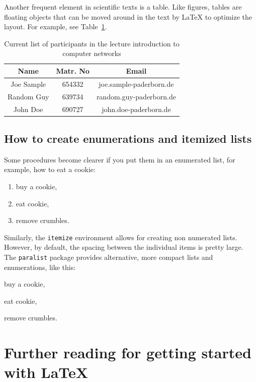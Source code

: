 \documentclass[12pt,twoside]{article}
\begin{document}
Another frequent element in scientific texts is a table. Like figures, tables are
floating objects that can be moved around in the text by LaTeX to optimize the layout.
For example, see Table~\ref{tab:participants}.

\begin{table}
	\centering
	\begin{tabular}{|c|c|c|}
		\hline
		Name & Matr. No & Email \\
		\hline \hline
		Joe Sample & 654332 & joe.sample\@uni-paderborn.de \\
		Random Guy & 639734 & random.guy\@uni-paderborn.de \\
		John Doe   & 690727 & john.doe\@uni-paderborn.de \\
		\hline
	\end{tabular}
	\caption{Current list of participants in the lecture introduction to computer networks}
	\label{tab:participants}
\end{table}


\subsection{How to create enumerations and itemized lists}

Some procedures become clearer if you put them in an enumerated list, for example, how to eat a cookie:
\begin{enumerate}
	\item buy a cookie,
	\item eat cookie,
	\item remove crumbles.
\end{enumerate}

Similarly, the \texttt{itemize} environment allows for creating non numerated lists.
However, by default, the spacing between the individual items is pretty large. The
\texttt{paralist} package provides alternative, more compact lists and enumerations,
like this:

\begin{compactenum}
	\item buy a cookie,
	\item eat cookie,
	\item remove crumbles.
\end{compactenum}


\section{Further reading for getting started with \LaTeX}
\label{sec:latex}
\end{document}
